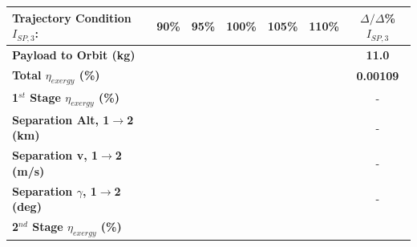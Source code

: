 \begin{table}[ht]%

	\centering
	\begin{tabular}{l c c c c c c} 
		\hline \textbf{Trajectory Condition}   \qquad  $I_{SP,3}$:
		&90\%
		&95\%
		&100\%
		&105\%
		&110\%
		& $\Delta/\Delta$\%$I_{SP,3}$
		\\
		\hline \textbf{Payload to Orbit (kg)}
		& \textbf{\PayloadToOrbitISPThreeNinety}
		& \textbf{\PayloadToOrbitISPThreeNinetyFive}
		& \textbf{\PayloadToOrbitISPThreeStandard}
		& \textbf{\PayloadToOrbitISPThreeOneHundredFive}
		& \textbf{\PayloadToOrbitISPThreeOneHundredTen}
		&\textbf{11.0}
		\\
		\textbf{Total $\eta_{exergy}$ (\%)}
		& \textbf{\totalExergyEffISPThreeNinety}
		& \textbf{\totalExergyEffISPThreeNinetyFive}
		& \textbf{\totalExergyEffISPThreeStandard}
		& \textbf{\totalExergyEffISPThreeOneHundredFive}
		& \textbf{\totalExergyEffISPThreeOneHundredTen}
		& \textbf{0.00109}
		\\
		\hline 
		\textbf{1$^{st}$ Stage $\eta_{exergy}$ (\%)}
		& \textbf{\firstExergyEffISPThreeNinety}
		& \textbf{\firstExergyEffISPThreeNinetyFive}
		& \textbf{\firstExergyEffISPThreeStandard}
		& \textbf{\firstExergyEffISPThreeOneHundredFive}
		& \textbf{\firstExergyEffISPThreeOneHundredTen}
		& -
		\\
		\textbf{Separation Alt, 1$\rightarrow$2 (km)}
		& \firstsecondSeparationAltISPThreeNinety
		& \firstsecondSeparationAltISPThreeNinetyFive
		& \firstsecondSeparationAltISPThreeStandard
		& \firstsecondSeparationAltISPThreeOneHundredFive
		& \firstsecondSeparationAltISPThreeOneHundredTen
		& -
		\\
		\textbf{Separation v, 1$\rightarrow$2 (m/s)}
		& \firstsecondSeparationvISPThreeNinety
		& \firstsecondSeparationvISPThreeNinetyFive
		& \firstsecondSeparationvISPThreeStandard
		& \firstsecondSeparationvISPThreeOneHundredFive
		& \firstsecondSeparationvISPThreeOneHundredTen
		& -
		\\
		\textbf{Separation $\gamma$, 1$\rightarrow$2 (deg)}
		& \firstsecondSeparationgammaISPThreeNinety
		& \firstsecondSeparationgammaISPThreeNinetyFive
		& \firstsecondSeparationgammaISPThreeStandard
		& \firstsecondSeparationgammaISPThreeOneHundredFive
		& \firstsecondSeparationgammaISPThreeOneHundredTen
		& -
		\\
		\hline 
		\textbf{2$^{nd}$ Stage $\eta_{exergy}$ (\%)}
		& \textbf{\secondExergyEffISPThreeNinety}
		& \textbf{\secondExergyEffISPThreeNinetyFive}
		& \textbf{\secondExergyEffISPThreeStandard}

\end{tabular}
\end{table}
